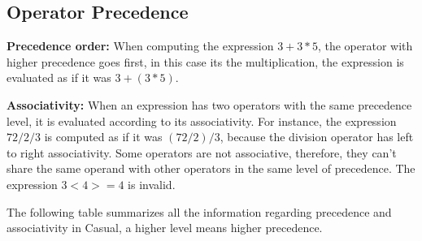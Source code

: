 \documentclass[12pt]{article}
\begin{document}
\newpage

\subsection{Operator Precedence}

\textbf{Precedence order:} When computing the expression $3 + 3 * 5$, the operator with higher precedence goes first, in this case its the multiplication, the expression is  evaluated as if it was $3 + (3 * 5)$. 

\textbf{Associativity:} When an expression has two operators with the same precedence level, it is evaluated according to its associativity.  For instance, the expression $72 / 2 / 3$ is computed as if it was $(72 / 2) / 3$, because the division operator has left to right associativity. Some operators are not associative, therefore, they can't share the same operand with other operators in the same level of precedence. The expression $3 < 4 >= 4$ is invalid.

The following table summarizes all the information regarding precedence and associativity in Casual, a higher level means higher precedence.
\end{document}
